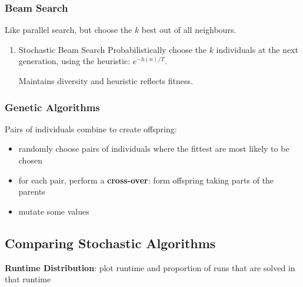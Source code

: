 \documentclass[11pt]{article}
\begin{document}
\subsubsection{Beam Search}
\label{sec:orgec2dfb7}
Like parallel search, but choose the \(k\) best out of all neighbours.
\begin{enumerate}
\item Stochastic Beam Search
\label{sec:org7dcae53}
Probabilistically choose the \(k\) individuals at the next generation, using the heuristic:
\(e^{-h(n)/T}\).

Maintains diversity and heuristic reflects fitness.
\end{enumerate}
\subsubsection{Genetic Algorithms}
\label{sec:org393f114}
Pairs of individuals combine to create offspring:
\begin{itemize}
\item randomly choose pairs of individuals where the fittest are most likely to be chosen
\item for each pair, perform a \textbf{cross-over}: form offspring taking parts of the parents
\item mutate some values
\end{itemize}
\subsection{Comparing Stochastic Algorithms}
\label{sec:org7fcc2bc}
\textbf{Runtime Distribution}: plot runtime and proportion of runs that are solved in that runtime
\end{document}
